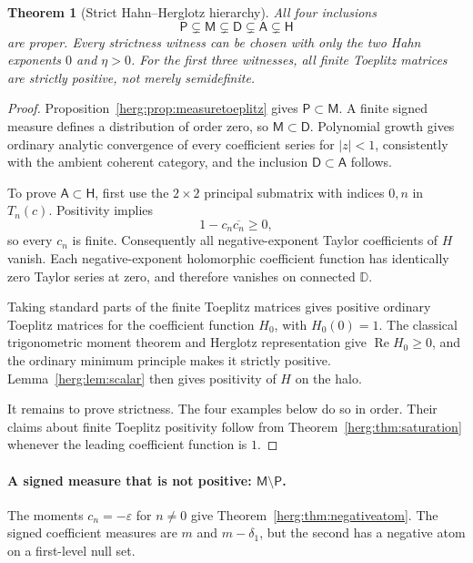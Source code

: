 \documentclass[11pt,letterpaper]{article}
\newtheorem{theorem}{Theorem}[section]
\theoremstyle{definition}
\newcommand{\D}{\mathbb D}\newcommand{\No}{\mathbf{No}}
\newcommand{\Rea}{\operatorname{Re}}
\newcommand{\eps}{\varepsilon}
\numberwithin{equation}{section}
\begin{document}
\begin{theorem}[Strict Hahn--Herglotz hierarchy]\label{herg:thm:hierarchy}
All four inclusions
\begin{equation}\label{herg:eq:hierarchy}
 \mathsf P\subsetneq\mathsf M\subsetneq\mathsf D
 \subsetneq\mathsf A\subsetneq\mathsf H
\end{equation}
are proper. Every strictness witness can be chosen with only the two Hahn exponents $0$ and $\eta>0$. For the first three witnesses, all finite Toeplitz matrices are strictly positive, not merely semidefinite.
\end{theorem}
\begin{proof}
Proposition~\ref{herg:prop:measuretoeplitz} gives $\mathsf P\subset\mathsf M$. A finite signed measure defines a distribution of order zero, so $\mathsf M\subset\mathsf D$. Polynomial growth gives ordinary analytic convergence of every coefficient series for $|z|<1$, consistently with the ambient coherent category, and the inclusion $\mathsf D\subset\mathsf A$ follows.

To prove $\mathsf A\subset\mathsf H$, first use the $2\times2$ principal submatrix with indices $0,n$ in $T_n(c)$. Positivity implies
\[
 1-c_n\overline{c_n}\ge0,
\]
so every $c_n$ is finite. Consequently all negative-exponent Taylor coefficients of $H$ vanish. Each negative-exponent holomorphic coefficient function has identically zero Taylor series at zero, and therefore vanishes on connected $\D$.

Taking standard parts of the finite Toeplitz matrices gives positive ordinary Toeplitz matrices for the coefficient function $H_0$, with $H_0(0)=1$. The classical trigonometric moment theorem and Herglotz representation give $\Rea H_0\ge0$, and the ordinary minimum principle makes it strictly positive. Lemma~\ref{herg:lem:scalar} then gives positivity of $H$ on the halo.

It remains to prove strictness. The four examples below do so in order. Their claims about finite Toeplitz positivity follow from Theorem~\ref{herg:thm:saturation} whenever the leading coefficient function is $1$.
\end{proof}

\paragraph{A signed measure that is not positive: $\mathsf M\setminus\mathsf P$.}
The moments $c_n=-\eps$ for $n\ne0$ give Theorem~\ref{herg:thm:negativeatom}. The signed coefficient measures are $m$ and $m-\delta_1$, but the second has a negative atom on a first-level null set.
\end{document}
